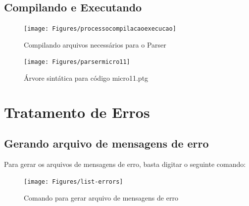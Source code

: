 \documentclass[hidelinks,12pt]{article}
\begin{document}
	\newpage
	\subsection{Compilando e Executando}
	
	\begin{figure}[h!]
		\centering
		\texttt{[image: Figures/processocompilacaoexecucao]}
		\caption{Compilando arquivos necessários para o Parser}
	\end{figure}
	
	\begin{figure}[h!]
		\centering
		\texttt{[image: Figures/parsermicro11]}
		\caption{Árvore sintática para código micro11.ptg}
	\end{figure}


\clearpage
	
\section{Tratamento de Erros}

\subsection{Gerando arquivo de mensagens de erro}

Para gerar os arquivos de mensagens de erro, basta digitar o seguinte comando:

	\begin{figure}[h!]
		\centering
		\texttt{[image: Figures/list-errors]}
		\caption{Comando para gerar arquivo de mensagens de erro}
	\end{figure}
	
\end{document}
